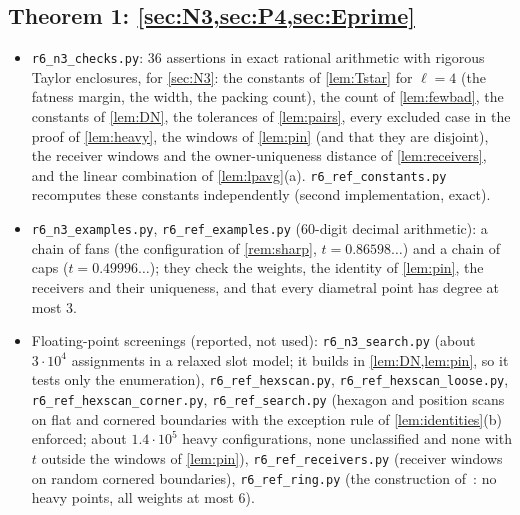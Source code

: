 \documentclass[11pt]{amsart}
\theoremstyle{definition}
\theoremstyle{remark}
\begin{document}
\subsection*{Theorem 1: \texorpdfstring{\cref{sec:N3,sec:P4,sec:Eprime}}{Sections 9-11}}
\begin{itemize}[leftmargin=2em]
\item \texttt{r6\_n3\_checks.py}: 36 assertions in exact rational arithmetic with rigorous Taylor enclosures, for \cref{sec:N3}: the constants of \cref{lem:Tstar} for $\ell=4$ (the fatness margin, the width, the packing count), the count of \cref{lem:fewbad}, the constants of \cref{lem:DN}, the tolerances of \cref{lem:pairs}, every excluded case in the proof of \cref{lem:heavy}, the windows of \cref{lem:pin} (and that they are disjoint), the receiver windows and the owner-uniqueness distance of \cref{lem:receivers}, and the linear combination of \cref{lem:lpavg}(a). \texttt{r6\_ref\_constants.py} recomputes these constants independently (second implementation, exact).
\item \texttt{r6\_n3\_examples.py}, \texttt{r6\_ref\_examples.py} ($60$-digit decimal arithmetic): a chain of fans (the configuration of \cref{rem:sharp}, $t=0.86598\ldots$) and a chain of caps ($t=0.49996\ldots$); they check the weights, the identity of \cref{lem:pin}, the receivers and their uniqueness, and that every diametral point has degree at most $3$.
\item Floating-point screenings (reported, not used): \texttt{r6\_n3\_search.py} (about $3\cdot10^4$ assignments in a relaxed slot model; it builds in \cref{lem:DN,lem:pin}, so it tests only the enumeration), \texttt{r6\_ref\_hexscan.py}, \texttt{r6\_ref\_hexscan\_loose.py}, \texttt{r6\_ref\_hexscan\_corner.py}, \texttt{r6\_ref\_search.py} (hexagon and position scans on flat and cornered boundaries with the exception rule of \cref{lem:identities}(b) enforced; about $1.4\cdot10^5$ heavy configurations, none unclassified and none with $t$ outside the windows of \cref{lem:pin}), \texttt{r6\_ref\_receivers.py} (receiver windows on random cornered boundaries), \texttt{r6\_ref\_ring.py} (the construction of~\cite{ienjoymath}: no heavy points, all weights at most $6$).

\end{itemize}
\end{document}
